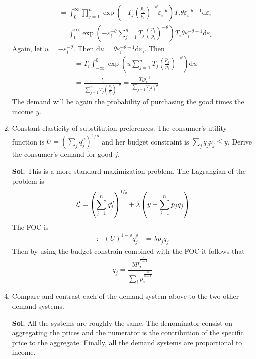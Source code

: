 \documentclass[12pt,oneside,reqno]{amsart}
\begin{document}
\begin{enumerate}[leftmargin=*,label=\textbf{\arabic*.}]
\begin{align*}
        &= \int_{0}^{\infty}\prod_{j=1}^n \exp\left(-T_j\left(\frac{p_j}{p_i}\right)^{-\theta}\varepsilon_i^{-\theta}\right) T_i\theta\varepsilon_i^{-\theta-1}\mathrm{d}\varepsilon_i \\ 
        &= \int_{0}^{\infty}\exp\left(-\varepsilon_i^{-\theta}\sum_{j=1}^nT_j\left(\frac{p_j}{p_i}\right)^{-\theta}\right) T_i\theta\varepsilon_i^{-\theta-1}\mathrm{d}\varepsilon_i
    \end{align*}
    Again, let $u=-\varepsilon_i^{-\theta}$. Then $\mathrm{d}u = \theta\varepsilon_i^{-\theta-1}\mathrm{d\varepsilon_i}$. Then 
    \begin{align*}
        &= T_i\int_{-\infty}^{0} \exp\left(u\sum_{j=1}^nT_j\left(\frac{p_j}{p_i}\right)^{-\theta}\right) \mathrm{d}u \\ 
        &= \frac{T_i}{\sum_{j=1}^nT_j\left(\frac{p_j}{p_i}\right)^{-\theta}}= \frac{T_ip_i^{-\theta}}{\sum_{j=1}^nT_jp_j^{-\theta}}
    \end{align*}
    The demand will be again the probability of purchasing the good times the income $y$. 
    \item Constant elasticity of substitution preferences. The consumer's utility function is $U=\left(\sum_j q_j^\rho\right)^{1 / \rho}$ and her budget constraint is $\sum_j q_j p_j \leq y$. Derive the consumer's demand for good $j$.
    \item[\textbf{Sol.}] This is a more standard maximization problem. The Lagrangian of the problem is 
    \begin{align*}
        \mathcal{L} = \left(\sum_{j=1}^n q_j^{\rho}\right)^{\sfrac{1}{\rho}} + \lambda\left(y - \sum_{j=1}^n p_j q_j\right) 
    \end{align*}
    The FOC is 
    \begin{align*}
        [q_j]&: & \left(U\right)^{1-\rho}q_j^\rho  &= \lambda p_jq_j &
    \end{align*}
    Then by using the budget constrain combined with the FOC it follows that
    \begin{equation*}
        q_j = \frac{yp_j^{\frac{\rho}{\rho-1}}}{\sum_{i}p_i^{\frac{\rho}{\rho-1}}}
    \end{equation*}
    \item Compare and contrast each of the demand system above to the two other demand systems.
    \item[\textbf{Sol.}] All the systems are roughly the same. The denominator consist on aggregating the prices and the numerator is the contribution of the specific price to the aggregate. Finally, all the demand systems are proportional to income. 
   
\end{enumerate}
 
\end{document}

